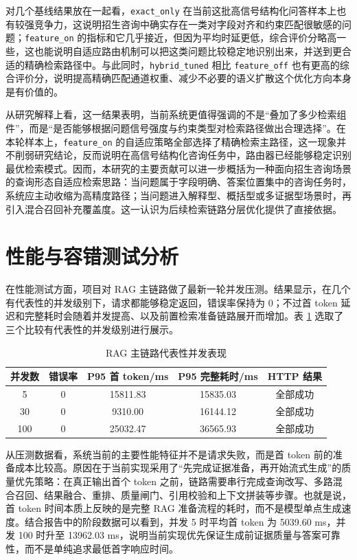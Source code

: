 \documentclass[UTF8,zihao=-4,oneside]{ctexbook}
\numberwithin{equation}{chapter}
\begin{document}
对几个基线结果放在一起看，\texttt{exact\_only} 在当前这批高信号结构化问答样本上也有较强竞争力，这说明招生咨询中确实存在一类对字段对齐和约束匹配很敏感的问题；\texttt{feature\_on} 的指标和它几乎接近，但因为平均时延更低，综合评价分略高一些，这也能说明自适应路由机制可以把这类问题比较稳定地识别出来，并送到更合适的精确检索路径中。与此同时，\texttt{hybrid\_tuned} 相比 \texttt{feature\_off} 也有更高的综合评价分，说明提高精确匹配通道权重、减少不必要的语义扩散这个优化方向本身是有价值的。

从研究解释上看，这一结果表明，当前系统更值得强调的不是“叠加了多少检索组件”，而是“是否能够根据问题信号强度与约束类型对检索路径做出合理选择”。在本轮样本上，\texttt{feature\_on} 的自适应策略全部选择了精确检索主路径，这一现象并不削弱研究结论，反而说明在高信号结构化咨询任务中，路由器已经能够稳定识别最优检索模式。因而，本研究的主要贡献可以进一步概括为一种面向招生咨询场景的查询形态自适应检索思路：当问题属于字段明确、答案位置集中的咨询任务时，系统应主动收缩为高精度路径；当问题进入解释型、概括型或多证据型场景时，再引入混合召回补充覆盖度。这一认识为后续检索链路分层优化提供了直接依据。

\section{性能与容错测试分析}
在性能测试方面，项目对 RAG 主链路做了最新一轮并发压测。结果显示，在几个有代表性的并发级别下，请求都能够稳定返回，错误率保持为 0；不过首 token 延迟和完整耗时会随着并发提高、以及前置检索准备链路展开而增加\cite{perfreport}。表 \ref{tab:perfmain} 选取了三个比较有代表性的并发级别进行展示。

\begin{table}[H]
  \centering
  \caption{RAG 主链路代表性并发表现}
  \label{tab:perfmain}
  \begin{tabular}{ccccc}
    \toprule
    并发数 & 错误率 & P95 首 token/ms & P95 完整耗时/ms & HTTP 结果 \\
    \midrule
    5 & 0 & 15811.83 & 15835.03 & 全部成功 \\
    30 & 0 & 9310.00 & 16144.12 & 全部成功 \\
    100 & 0 & 25032.47 & 36565.93 & 全部成功 \\
    \bottomrule
  \end{tabular}
\end{table}

从压测数据看，系统当前的主要性能特征并不是请求失败，而是首 token 前的准备成本比较高。原因在于当前实现采用了“先完成证据准备，再开始流式生成”的质量优先策略：在真正输出首个 token 之前，链路需要串行完成查询改写、多路混合召回、结果融合、重排、质量闸门、引用校验和上下文拼装等步骤。也就是说，首 token 时间本质上反映的是完整 RAG 准备流程的耗时，而不是模型单点生成速度。结合报告中的阶段数据可以看到，并发 5 时平均首 token 为 5039.60 ms，并发 100 时升至 13962.03 ms，说明当前实现优先保证生成前证据质量与答案可靠性，而不是单纯追求最低首字响应时间。
\end{document}
